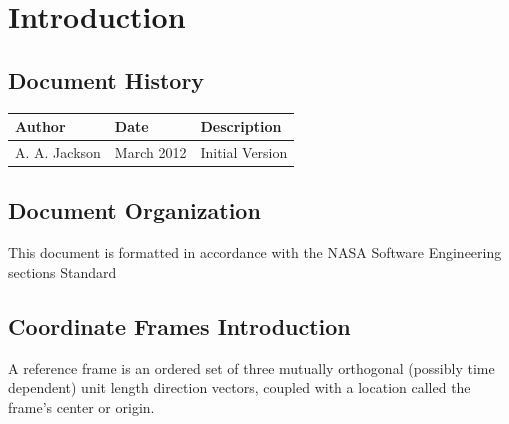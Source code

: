\documentclass[twoside,11pt,titlepage]{report}
\newcommand\documentHistory{
{\bf Author} & {\bf Date} & {\bf Description} \\ \hline \hline
A. A. Jackson & March 2012 &  Initial Version \\ \hline
}
\begin{document}

\date{\RELEASEMONTH\ \RELEASEYEAR}
\modelname{\COORDFRAMEDesc}
\doctype{}
\author{\ModelAuthor}
\makeDynenvTitlepage


\setcounter{chapter}{0}
\tableofcontents
\vfill
\chapter{Introduction}\label{ch:intro}



\section{Document History}

\begin{tabular}{||l|l|l|} \hline
\documentHistory
\end{tabular}

\section{Document Organization}
This document is formatted in accordance with the
NASA Software Engineering sections Standard~\cite{NASA:SWE}

\section{Coordinate Frames Introduction}
 A reference frame is an ordered set of three
mutually orthogonal (possibly time dependent) unit length
direction vectors, coupled with a location
called the frame's center or origin.
\end{document}
